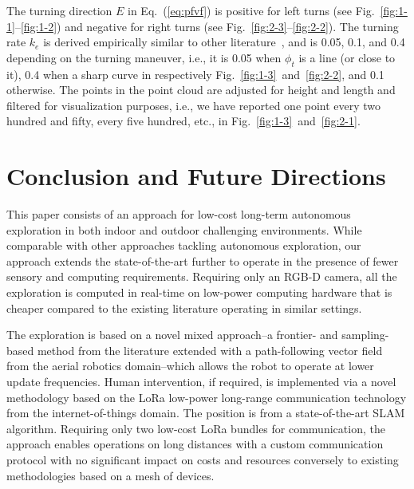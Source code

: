 \documentclass[lettersize,journal,twoside]{IEEEtran}
\theoremstyle{definition}
\begin{document}
The turning direction $E$ in Eq.~(\ref{eq:pfvf}) is positive for left turns (see Fig.~\ref{fig:1-1}--\ref{fig:1-2}) and negative for right turns (see Fig.~\ref{fig:2-3}--\ref{fig:2-2}). The turning rate $k_e$ is derived empirically similar to other literature~\cite{seewald2022energy,garcia2017guidance}, and is 0.05, 0.1, and 0.4 depending on the turning maneuver, i.e., it is 0.05 when $\phi_t$ is a line (or close to it), 0.4 when a sharp curve in respectively Fig.~\ref{fig:1-3}~and~\ref{fig:2-2}, and 0.1 otherwise. The points in the point cloud are adjusted for height and length and filtered for visualization purposes, i.e., we have reported one point every two hundred and fifty, every five hundred, etc., in Fig.~\ref{fig:1-3}~and~\ref{fig:2-1}.

\section{Conclusion and Future Directions}
\label{sec:cf}
\noindent
This paper consists of an %
approach %
for low-cost long-term autonomous exploration in both indoor and outdoor challenging environments. While comparable with other %
approaches tackling autonomous exploration, %
our approach extends the state-of-the-art further to operate in the presence of fewer sensory and computing requirements. Requiring only an RGB-D camera, all the exploration is computed in real-time on low-power computing hardware that is cheaper compared to the existing literature operating in similar settings.%

The exploration is based on a novel mixed approach--a frontier- and sampling-based method from the literature extended with a path-following vector field %
from the aerial robotics domain--which allows the robot to operate at lower update frequencies. 
Human intervention, if required, is implemented via a novel methodology based on the LoRa low-power long-range communication technology %
from the internet-of-things domain. The position is from a state-of-the-art SLAM algorithm. %
Requiring only two low-cost LoRa bundles for communication, the approach enables operations on long distances with a custom communication protocol with no significant impact on costs and resources conversely to existing methodologies based on a mesh of devices. %
\end{document}
